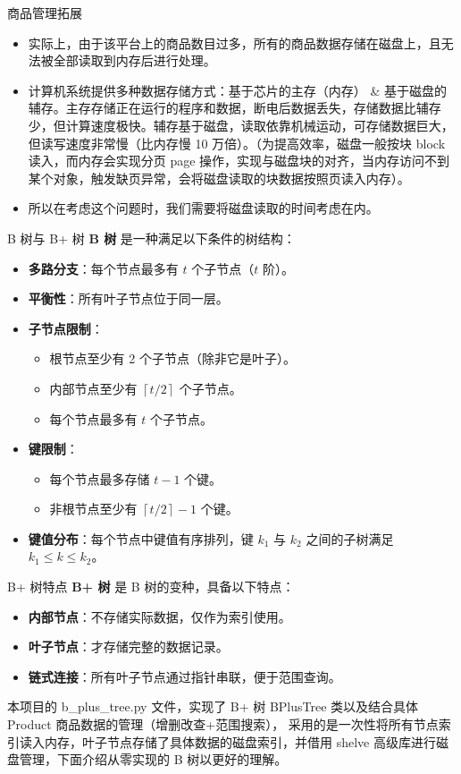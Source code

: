 \documentclass{beamer}
\begin{document}
\begin{frame}{商品管理拓展}
\begin{itemize}
\item 实际上，由于该平台上的商品数目过多，所有的商品数据存储在磁盘上，且无法被全部读取到内存后进行处理。
\item 计算机系统提供多种数据存储方式：基于芯片的主存（内存） \& 基于磁盘的辅存。主存存储正在运行的程序和数据，断电后数据丢失，存储数据比辅存少，但计算速度极快。辅存基于磁盘，读取依靠机械运动，可存储数据巨大，但读写速度非常慢（比内存慢 10 万倍）。（为提高效率，磁盘一般按块 block 读入，而内存会实现分页 page 操作，实现与磁盘块的对齐，当内存访问不到某个对象，触发缺页异常，会将磁盘读取的块数据按照页读入内存）。
\item 所以在考虑这个问题时，我们需要将磁盘读取的时间考虑在内。
\end{itemize}
\end{frame}

\begin{frame}{B 树与 B+ 树}
\textbf{B 树} 是一种满足以下条件的树结构：
\begin{itemize}
  \item \textbf{多路分支}：每个节点最多有 $t$ 个子节点（$t$ 阶）。
  \item \textbf{平衡性}：所有叶子节点位于同一层。
  \item \textbf{子节点限制}：
  \begin{itemize}
    \item 根节点至少有 2 个子节点（除非它是叶子）。
    \item 内部节点至少有 $\left\lceil t/2 \right\rceil$ 个子节点。
    \item 每个节点最多有 $t$ 个子节点。
  \end{itemize}
  \item \textbf{键限制}：
  \begin{itemize}
    \item 每个节点最多存储 $t - 1$ 个键。
    \item 非根节点至少有 $\left\lceil t/2 \right\rceil - 1$ 个键。
  \end{itemize}
  \item \textbf{键值分布}：每个节点中键值有序排列，键 $k_1$ 与 $k_2$ 之间的子树满足 $k_1 \leq k \leq k_2$。
\end{itemize}
\end{frame}

\begin{frame}{B+ 树特点}
\textbf{B+ 树} 是 B 树的变种，具备以下特点：
\begin{itemize}
  \item \textbf{内部节点}：不存储实际数据，仅作为索引使用。
  \item \textbf{叶子节点}：才存储完整的数据记录。
  \item \textbf{链式连接}：所有叶子节点通过指针串联，便于范围查询。
\end{itemize}

本项目的 b\_plus\_tree.py 文件，实现了 B+ 树 BPlusTree 类以及结合具体 Product 商品数据的管理（增删改查+范围搜索），
采用的是一次性将所有节点索引读入内存，叶子节点存储了具体数据的磁盘索引，并借用 shelve 高级库进行磁盘管理，下面介绍从零实现的 B 树以更好的理解。
\end{frame}
\end{document}
